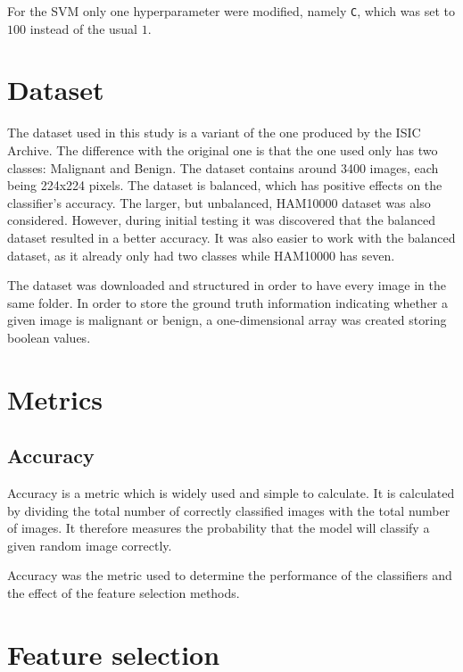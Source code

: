 \documentclass{kththesis}
\begin{document}
For the SVM only one hyperparameter were modified, namely \verb|C|, which was set to $100$ instead of the usual $1$.



\section{Dataset}

The dataset used in this study is a variant of the one produced by the ISIC Archive. The difference with the original one is that the one used only has two classes: Malignant and Benign. The dataset contains around 3400 images, each being 224x224 pixels. The dataset is balanced, which has positive effects on the classifier's accuracy. The larger, but unbalanced, HAM10000 dataset was also considered. However, during initial testing it was discovered that the balanced dataset resulted in a better accuracy. It was also easier to work with the balanced dataset, as it already only had two classes while HAM10000 has seven.

The dataset was downloaded and structured in order to have every image in the same folder. In order to store the ground truth information indicating whether a given image is malignant or benign, a one-dimensional array was created storing boolean values.

\section{Metrics}

\subsection{Accuracy}

Accuracy is a metric which is widely used and simple to calculate.
It is calculated by dividing the total number of correctly classified images with the total number of images. 
It therefore measures the probability that the model will classify a given random image correctly. \parencite{takiddin2021artificial}

Accuracy was the metric used to determine the performance of the classifiers and the effect of the feature selection methods.


\section{Feature selection}
\end{document}
